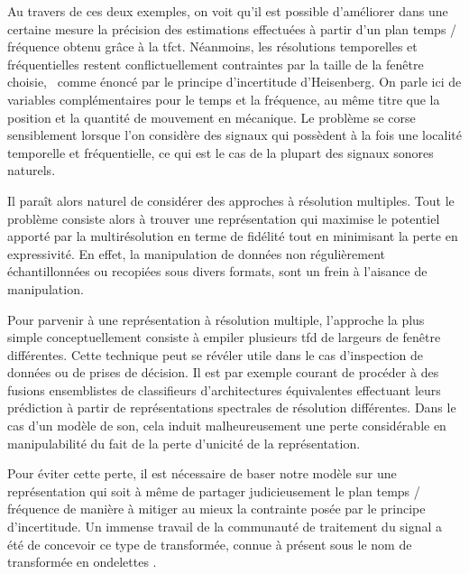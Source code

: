 Au travers de ces deux exemples, on voit qu'il est possible d'améliorer dans une certaine mesure la précision des estimations effectuées à partir d'un plan temps / fréquence obtenu grâce à la tfct. Néanmoins, les résolutions temporelles et fréquentielles restent conflictuellement contraintes par la taille de la fenêtre choisie,~\cite{slepian1983some} comme énoncé par le principe d'incertitude d'Heisenberg. On parle ici de variables complémentaires pour le temps et la fréquence, au même titre que la position et la quantité de mouvement en mécanique. Le problème se corse sensiblement lorsque l'on considère des signaux qui possèdent à la fois une localité temporelle et fréquentielle, ce qui est le cas de la plupart des signaux sonores naturels.

Il paraît alors naturel de considérer des approches à résolution multiples. Tout le problème consiste alors à trouver une représentation qui maximise le potentiel apporté par la multirésolution en terme de fidélité tout en minimisant la perte en expressivité. En effet, la manipulation de données non régulièrement échantillonnées ou recopiées sous divers formats, sont un frein à l'aisance de manipulation.


Pour parvenir à une représentation à résolution multiple, l'approche la plus simple conceptuellement consiste à \og empiler \fg plusieurs tfd de largeurs de fenêtre différentes. Cette technique peut se révéler utile dans le cas d'inspection de données ou de prises de décision. Il est par exemple courant de procéder à des fusions ensemblistes de classifieurs d'architectures équivalentes effectuant leurs prédiction à partir de représentations spectrales de résolution différentes. Dans le cas d'un modèle de son, cela induit malheureusement une perte considérable en manipulabilité du fait de la perte d'unicité de la représentation.

Pour éviter cette perte, il est nécessaire de baser notre modèle sur une représentation qui soit à même de partager judicieusement le plan temps / fréquence de manière à mitiger au mieux la contrainte posée par le principe d'incertitude. Un immense travail de la communauté de traitement du signal a été de concevoir ce type de transformée, connue à présent sous le nom de transformée en \og ondelettes \fg.~\cite{mallat1989theory}



